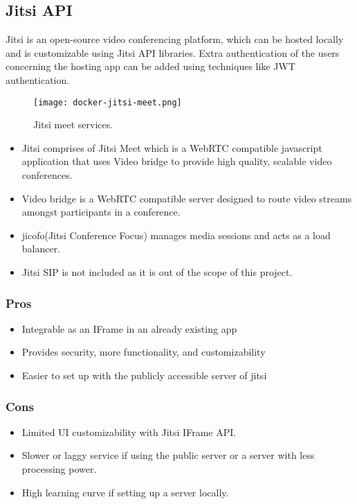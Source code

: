 \subsection{Jitsi API}
Jitsi is an open-source video conferencing platform, which can be hosted locally and is customizable using Jitsi API libraries.
Extra authentication of the users concerning the hosting app can be added using techniques like JWT authentication.

\begin{figure}[h!]
    \begin{center}
        \texttt{[image: docker-jitsi-meet.png]}
    \end{center}
    \caption{Jitsi meet services.}
    \label{fig:jitsimeet}
\end{figure}

\begin{itemize}
    \item  Jitsi comprises of Jitsi Meet which is a WebRTC compatible javascript application that uses Video bridge to provide high quality, scalable video conferences.
    \item Video bridge is a WebRTC compatible server designed to route video streams amongst participants in a conference.
    \item jicofo(Jitsi Conference Focus) manages media sessions and acts as a load balancer.
    \item Jitsi SIP is not included as it is out of the scope of this project.
\end{itemize}

\subsubsection{Pros}

\begin{itemize}
    \item Integrable as an IFrame in an already existing app
    \item Provides security, more functionality, and customizability 
    \item Easier to set up with the publicly accessible server of jitsi
\end{itemize}

\subsubsection{Cons}

\begin{itemize}
    \item Limited UI customizability with Jitsi IFrame API.
    \item Slower or laggy service if using the public server or a server with less processing power.
    \item High learning curve if setting up a server locally.
\end{itemize}